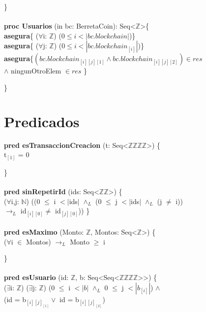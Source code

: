 \documentclass{article}
\newcommand{\Entero}{$\mathds{Z}$}
\newcommand{\Natural}{$\mathds{N}$}
\newcommand{\tuplaDeDosEnteros}{Seq\textless\Entero\texttimes\Entero\textgreater}
\newcommand{\tuplaDeCuatroEnteros}{Seq\textless\Entero\texttimes\Entero\texttimes\Entero\texttimes\Entero\textgreater}
\newcommand{\tuplaDeTuplaDeCuatroEnteros}{{Seq\textless Seq\textless\Entero\texttimes\Entero\texttimes\Entero\texttimes\Entero\textgreater\textgreater}}
\begin{document}
    \}\\\\

    \textbf{proc Usuarios} (in bc: BerretaCoin): Seq\textless\Entero\textgreater\{\\
        \indent\indent \textbf{asegura}\{ ($\forall$i: \Entero) ($0 \le i < |bc.blockchain|$)\}\\

        \indent\indent \textbf{asegura}\{ ($\forall$j: \Entero) ($0 \le i < |bc.blockchain_{[i]}|$)\}\\

        \indent\indent \textbf{asegura}\{$ (bc.blockchain_{[i][j][1]} \land bc.blockchain_{[i][j][2]}) \in res$\\
        \indent\indent\indent\indent\indent $\land$ ningunOtroElem $\in res$ \}
    
    \}







\newpage
\section*{Predicados}

    \textbf{pred esTransaccionCreacion} (t: \tuplaDeCuatroEnteros) \{\\
        \indent\indent t$_{[1]}$ = 0

    \}\\\\

    \textbf{pred sinRepetirId} (ids: \tuplaDeDosEnteros) \{\\
        \indent\indent($\forall$i,j: \Natural) ((0 $\leq$ i $<|$ids$|$ $\land_L$ (0 $\leq$ j $<|$ids$|$ $\land_L$ (j $\neq$ i))\\
        \indent\indent$\rightarrow_L$ id$_{[i][0]} \neq$ id$_{[j][0]}$)) \}\\\\

    \textbf{pred esMaximo} (Monto: \Entero, Montos: Seq\textless$\mathds{Z}$\textgreater) \{\\
        \indent\indent($\forall$i $\in$ Montos) $\rightarrow_L$ Monto $\geq$ i

    \}\\\\

    \textbf{pred esUsuario} (id: \Entero, b: \tuplaDeTuplaDeCuatroEnteros) \{\\
        \indent\indent($\exists$i: \Entero) ($\exists$j: \Entero) (0 $\leq$ i $< |b|$ $\land_L$ 0 $\leq$ j $< |b_{[i]}|$) $\land$\\
        \indent\indent\indent\indent\indent\indent\indent         (id = b$_{[i][j]_{[1]}} \lor$ id = b$_{[i][j]_{[2]}}$)
\end{document}

